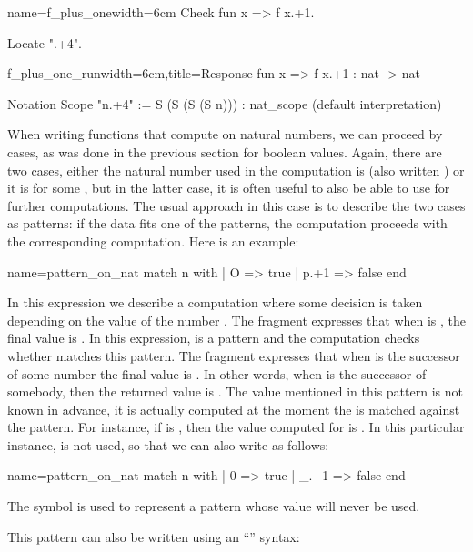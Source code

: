 \begin{coq}{name=f_plus_one}{width=6cm}
Check fun x => f x.+1.

Locate ".+4".
$~$
$~$
$~$
\end{coq}
\begin{coqout}{f_plus_one_run}{width=6cm,title=Response}
fun x => f x.+1 : nat -> nat

Notation        Scope
"n.+4" := S (S (S (S n)))  : nat_scope
    (default interpretation)
\end{coqout}

When writing functions that compute on natural numbers, we can
proceed by cases, as was done in the previous section for boolean
values.  Again, there are two cases, either the natural number used in
the computation is  (also written ) or it is  for
some , but in the latter case, it is often useful to also be able
to use  for further computations.  The usual approach in this
case is to describe the two cases as patterns: if the data fits one of
the patterns, the computation proceeds with the corresponding
computation.  Here is an example:

\begin{coq}{name=pattern_on_nat}{}
match n with | O => true | p.+1 => false end
\end{coq}
In this expression we describe a computation where some decision is
taken depending on the value of the number .  The fragment 
 expresses that when  is , the final value is
.  In this expression,  is a pattern and the computation
checks whether  matches this pattern.  The fragment
  expresses that when  is the successor of
some number  the final value is .  In other words, when
 is the successor of somebody, then the returned value is
.  The value  mentioned in this pattern is not known in
advance, it is actually computed at the moment the  is matched
against the pattern.  For instance, if  is , then the value
computed for  is .  In this particular instance,  is
not used, so that we can also write as follows:

\begin{coq}{name=pattern_on_nat}{}
match n with | 0 => true | _.+1 => false end
\end{coq}
The symbol \C{_} is used to represent a pattern whose value will never be
used.

This pattern can also be written using an ``''
syntax:

